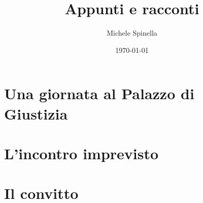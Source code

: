 \documentclass[a4,10pt,oneside,openany]{memoir}
\begin{document}
\title{Appunti e racconti}
\author{Michele Spinella}
\date{\today}
\maketitle

\chapter*{Una giornata al Palazzo di Giustizia}

\chapter*{L'incontro imprevisto}

\chapter*{Il convitto}

\end{document}
